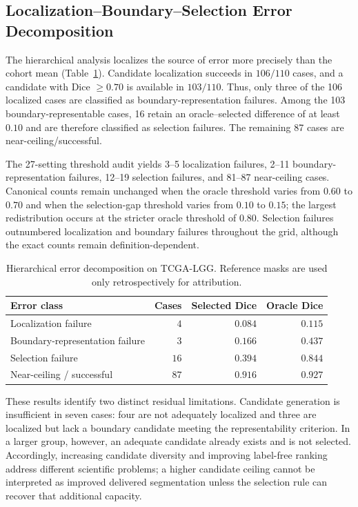 \documentclass[11pt,a4paper]{article}
\begin{document}
\subsection{Localization--Boundary--Selection Error Decomposition}\label{sec:lbs}

The hierarchical analysis localizes the source of error more precisely than the
cohort mean (Table~\ref{tab:lbs}). Candidate localization succeeds in $106/110$
cases, and a candidate with Dice $\ge0.70$ is available in $103/110$. Thus, only
three of the 106 localized cases are classified as boundary-representation
failures. Among the 103 boundary-representable cases, 16 retain an
oracle--selected difference of at least $0.10$ and are therefore classified as
selection failures. The remaining 87 cases are near-ceiling/successful.

The 27-setting threshold audit yields 3--5 localization failures, 2--11
boundary-representation failures, 12--19 selection failures, and 81--87
near-ceiling cases. Canonical counts remain unchanged when the oracle threshold
varies from $0.60$ to $0.70$ and when the selection-gap threshold varies
from $0.10$ to $0.15$; the largest redistribution occurs at the stricter
oracle threshold of $0.80$. Selection failures outnumbered localization and
boundary failures throughout the grid, although the exact counts remain
definition-dependent.

\begin{table}[htbp]\centering
\caption{Hierarchical error decomposition on TCGA-LGG. Reference masks are used
only retrospectively for attribution.}\label{tab:lbs}
\begin{tabular}{lrrr}
\toprule
Error class & Cases & Selected Dice & Oracle Dice \\
\midrule
Localization failure & $4$ & $0.084$ & $0.115$ \\
Boundary-representation failure & $3$ & $0.166$ & $0.437$ \\
Selection failure & $16$ & $0.394$ & $0.844$ \\
Near-ceiling / successful & $87$ & $0.916$ & $0.927$ \\
\bottomrule
\end{tabular}
\end{table}

These results identify two distinct residual limitations. Candidate generation
is insufficient in seven cases: four are not adequately localized and three
are localized but lack a boundary candidate meeting the representability
criterion. In a larger group, however, an adequate candidate already exists and
is not selected. Accordingly, increasing candidate diversity and improving
label-free ranking address different scientific problems; a higher candidate
ceiling cannot be interpreted as improved delivered segmentation unless the
selection rule can recover that additional capacity.
\end{document}

